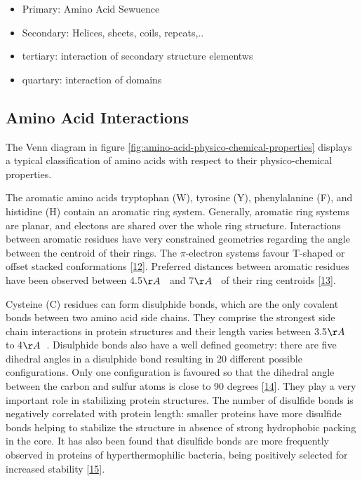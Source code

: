 \documentclass[12pt,a4paper,twoside]{book}
\providecommand{\tightlist}{%
  \setlength{\itemsep}{0pt}\setlength{\parskip}{0pt}}
\theoremstyle{definition}
\theoremstyle{definition}
\theoremstyle{remark}
\begin{document}
\begin{itemize}
\tightlist
\item
  Primary: Amino Acid Sewuence
\item
  Secondary: Helices, sheets, coils, repeats,..
\item
  tertiary: interaction of secondary structure elementws
\item
  quartary: interaction of domains
\end{itemize}

\subsection{Amino Acid Interactions}\label{amino-acid-interactions}

The Venn diagram in figure
\ref{fig:amino-acid-physico-chemical-properties} displays a typical
classification of amino acids with respect to their physico-chemical
properties.

The aromatic amino acids tryptophan (W), tyrosine (Y), phenylalanine
(F), and histidine (H) contain an aromatic ring system. Generally,
aromatic ring systems are planar, and electons are shared over the whole
ring structure. Interactions between aromatic residues have very
constrained geometries regarding the angle between the centroid of their
rings. The \(\pi\)-electron systems favour T-shaped or offset stacked
conformations {[}\protect\hyperlink{ref-Waters2002}{12}{]}. Preferred
distances between aromatic residues have been observed between
4.5\(\AA \; \;\) and 7\(\AA \; \;\) of their ring centroids
{[}\protect\hyperlink{ref-Burley1985}{13}{]}.

Cysteine (C) residues can form disulphide bonds, which are the only
covalent bonds between two amino acid side chains. They comprise the
strongest side chain interactions in protein structures and their length
varies between 3.5\(\AA \; \;\) to 4\(\AA \; \;\). Disulphide bonds also
have a well defined geometry: there are five dihedral angles in a
disulphide bond resulting in 20 different possible configurations. Only
one configuration is favoured so that the dihedral angle between the
carbon and sulfur atoms is close to 90 degrees
{[}\protect\hyperlink{ref-Thornton1981}{14}{]}. They play a very
important role in stabilizing protein structures. The number of
disulfide bonds is negatively correlated with protein length: smaller
proteins have more disulfide bonds helping to stabilize the structure in
absence of strong hydrophobic packing in the core. It has also been
found that disulfide bonds are more frequently observed in proteins of
hyperthermophilic bacteria, being positively selected for increased
stability {[}\protect\hyperlink{ref-Bastolla2005}{15}{]}.
\end{document}
